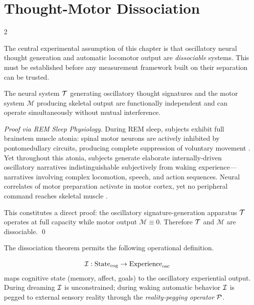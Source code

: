 \section{Thought-Motor Dissociation}

\begin{multicols}{2}

The central experimental assumption of this chapter is that oscillatory neural thought generation and automatic locomotor output are \emph{dissociable} systems. This must be established before any measurement framework built on their separation can be trusted.

\begin{theorem}
\label{thm:ch10-dissociation}
The neural system $\mathcal{T}$ generating oscillatory thought signatures and the motor system $\mathcal{M}$ producing skeletal output are functionally independent and can operate simultaneously without mutual interference.
\end{theorem}

\begin{proof}[Proof via REM Sleep Physiology]
During REM sleep, subjects exhibit full brainstem muscle atonia: spinal motor neurons are actively inhibited by pontomedullary circuits, producing complete suppression of voluntary movement \citep{chase1990}. Yet throughout this atonia, subjects generate elaborate internally-driven oscillatory narratives indistinguishable subjectively from waking experience---narratives involving complex locomotion, speech, and action sequences. Neural correlates of motor preparation activate in motor cortex, yet no peripheral command reaches skeletal muscle \citep{hobson2002cognitive}.

This constitutes a direct proof: the oscillatory signature-generation apparatus $\mathcal{T}$ operates at full capacity while motor output $\mathcal{M} \equiv 0$. Therefore $\mathcal{T}$ and $\mathcal{M}$ are dissociable. \qed
\end{proof}

The dissociation theorem permits the following operational definition.

\begin{definition}
\begin{equation}
\mathcal{I} : \mathrm{State}_{\mathrm{cog}} \to \mathrm{Experience}_{\mathrm{osc}}
\end{equation}
maps cognitive state (memory, affect, goals) to the oscillatory experiential output. During dreaming $\mathcal{I}$ is unconstrained; during waking automatic behavior $\mathcal{I}$ is pegged to external sensory reality through the \emph{reality-pegging operator} $\mathcal{P}$.
\end{definition}


\end{multicols}
